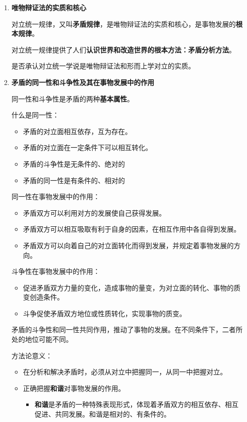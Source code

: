 \documentclass[12pt, a4paper, oneside]{ctexart}
\begin{document}
\begin{enumerate}
  \item {\bf 唯物辩证法的实质和核心}
  
  对立统一规律，又叫\textbf{矛盾规律}，是唯物辩证法的实质和核心，是事物发展的\textbf{根本规律}。

  对立统一规律提供了人们\textbf{认识世界和改造世界的根本方法：矛盾分析方法}。

  是否承认对立统一学说是唯物辩证法和形而上学对立的实质。

  \item {\bf 矛盾的同一性和斗争性及其在事物发展中的作用}
  
  同一性和斗争性是矛盾的两种\textbf{基本属性}。

  什么是同一性：
  \begin{itemize}
    \item 矛盾的对立面相互依存，互为存在。
    \item 矛盾的对立面在一定条件下可以相互转化。
  \end{itemize}

  \begin{itemize}
    \item 矛盾的斗争性是无条件的、绝对的
    \item 矛盾的同一性是有条件的、相对的
  \end{itemize}

  同一性在事物发展中的作用：
  \begin{itemize}
    \item 矛盾双方可以利用对方的发展使自己获得发展。
    \item 矛盾双方可以相互吸取有利于自身的因素，在相互作用中各自得到发展。
    \item 矛盾双方可以向着自己的对立面转化而得到发展，并规定着事物发展的方向。
  \end{itemize}

  斗争性在事物发展中的作用：
  \begin{itemize}
    \item 促进矛盾双方力量的变化，造成事物的量变，为对立面的转化、事物的质变创造条件。
    \item 斗争促使矛盾双方地位或性质转化，实现事物的质变。
  \end{itemize}

  矛盾的斗争性和同一性共同作用，推动了事物的发展。在不同条件下，二者所处的地位可能不同。

  方法论意义：
  \begin{itemize}
    \item 在分析和解决矛盾时，必须从对立中把握同一，从同一中把握对立。
    \item 正确把握\textbf{和谐}对事物发展的作用。
    \begin{itemize}
      \item \textbf{和谐}是矛盾的一种特殊表现形式，体现着矛盾双方的相互依存、相互促进、共同发展。和谐是相对的、有条件的。
    \end{itemize}
  \end{itemize}


\end{enumerate}
\end{document}
